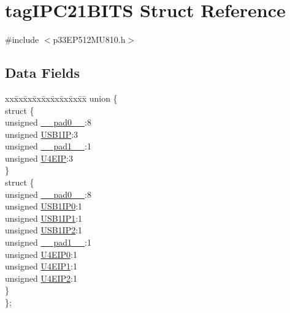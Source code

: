\hypertarget{structtag_i_p_c21_b_i_t_s}{}\section{tag\+I\+P\+C21\+B\+I\+TS Struct Reference}
\label{structtag_i_p_c21_b_i_t_s}


{\ttfamily \#include $<$p33\+E\+P512\+M\+U810.\+h$>$}

\subsection*{Data Fields}
\begin{DoxyCompactItemize}
\item 
\begin{tabbing}
xx\=xx\=xx\=xx\=xx\=xx\=xx\=xx\=xx\=\kill
union \{\\
\>struct \{\\
\>\>unsigned \hyperlink{structtag_i_p_c21_b_i_t_s_adf71f3d8410c1f1dbbc96680a92c49af}{\_\_pad0\_\_}:8\\
\>\>unsigned \hyperlink{structtag_i_p_c21_b_i_t_s_a2e1455638f38bec63c8581fb20614a08}{USB1IP}:3\\
\>\>unsigned \hyperlink{structtag_i_p_c21_b_i_t_s_acaf2d0924a107ec6e8d2e31febaf66f9}{\_\_pad1\_\_}:1\\
\>\>unsigned \hyperlink{structtag_i_p_c21_b_i_t_s_a3a9057d54418049d1c256bb0b619fa52}{U4EIP}:3\\
\>\} \\
\>struct \{\\
\>\>unsigned \hyperlink{structtag_i_p_c21_b_i_t_s_adf71f3d8410c1f1dbbc96680a92c49af}{\_\_pad0\_\_}:8\\
\>\>unsigned \hyperlink{structtag_i_p_c21_b_i_t_s_ac360098147143ba1a6ffd3b9e6f2c470}{USB1IP0}:1\\
\>\>unsigned \hyperlink{structtag_i_p_c21_b_i_t_s_ac4749575e87c80e2912e13390a6f6ed1}{USB1IP1}:1\\
\>\>unsigned \hyperlink{structtag_i_p_c21_b_i_t_s_aa8c9797d7c9d7e595ecfff84dc8dae35}{USB1IP2}:1\\
\>\>unsigned \hyperlink{structtag_i_p_c21_b_i_t_s_acaf2d0924a107ec6e8d2e31febaf66f9}{\_\_pad1\_\_}:1\\
\>\>unsigned \hyperlink{structtag_i_p_c21_b_i_t_s_a68e8129de0d31648fffc8ac81158cb9a}{U4EIP0}:1\\
\>\>unsigned \hyperlink{structtag_i_p_c21_b_i_t_s_a3a7cd8ca450309515859cb6360065ecd}{U4EIP1}:1\\
\>\>unsigned \hyperlink{structtag_i_p_c21_b_i_t_s_a7fbf4198ca1fdc20a44305357bd69482}{U4EIP2}:1\\
\>\} \\
\}; \\

\end{tabbing}\end{DoxyCompactItemize}



